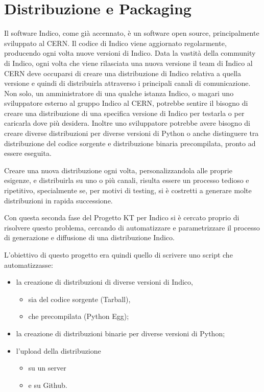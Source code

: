 \chapter{Distribuzione e Packaging} \label{chap:distribuzione_packaging}

    Il software Indico, come già accennato, è un software open source, principalmente sviluppato al \ac{CERN}. Il codice di Indico viene aggiornato regolarmente, producendo ogni volta nuove versioni di Indico. Data la vastità della community di Indico, ogni volta che viene rilasciata una nuova versione il team di Indico al \ac{CERN} deve occuparsi di creare una distribuzione di Indico relativa a quella versione e quindi di distribuirla attraverso i principali canali di comunicazione. Non solo, un amministratore di una qualche istanza Indico, o magari uno sviluppatore esterno al gruppo Indico al \ac{CERN}, potrebbe sentire il bisogno di creare una distribuzione di una specifica versione di Indico per testarla o per caricarla dove più desidera. Inoltre uno sviluppatore potrebbe avere bisogno di creare diverse distribuzioni per diverse versioni di Python o anche distinguere tra distribuzione del codice sorgente e distribuzione binaria precompilata, pronto ad essere eseguita.
    
    Creare una nuova distribuzione ogni volta, personalizzandola alle proprie esigenze, e distribuirla su uno o più canali, risulta essere un processo tedioso e ripetitivo, specialmente se, per motivi di testing, si è costretti a generare molte distribuzioni in rapida successione.
    
    Con questa seconda fase del Progetto KT per Indico si è cercato proprio di risolvere questo problema, cercando di automatizzare e parametrizzare il processo di generazione e diffusione di una distribuzione Indico.
    
    L'obiettivo di questo progetto era quindi quello di scrivere uno script che automatizzasse:
    
    \begin{itemize}
        \item la creazione di distribuzioni di diverse versioni di Indico,
        \begin{itemize}
            \item sia del codice sorgente (Tarball),
            \item che precompilata (Python Egg);
        \end{itemize}
        \item la creazione di distribuzioni binarie per diverse versioni di Python;
        \item l'upload della distribuzione
        \begin{itemize}
            \item su un server
            \item e su Github.
        \end{itemize}
    \end{itemize}
    
